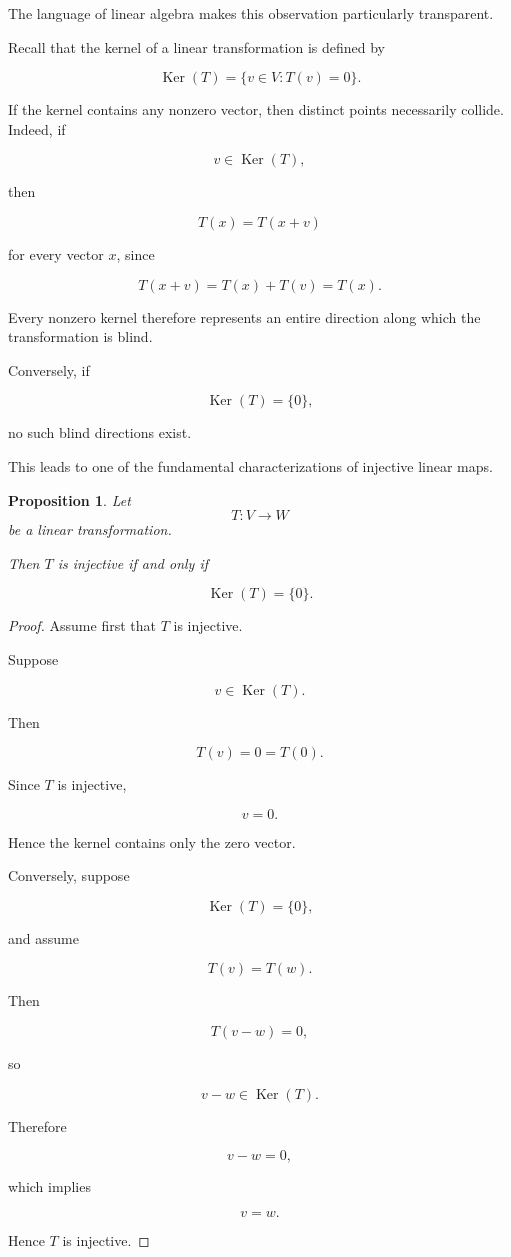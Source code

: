 \documentclass[11pt]{book}
\numberwithin{equation}{chapter}
\theoremstyle{definition}
\theoremstyle{plain}
\newtheorem{proposition}[definition]{Proposition}
\theoremstyle{remark}
\DeclareMathOperator{\Ker}{Ker}
\begin{document}
The language of linear algebra makes this observation particularly transparent.

Recall that the kernel of a linear transformation is defined by

\[
\Ker(T)
=
\{v\in V:T(v)=0\}.
\]

If the kernel contains any nonzero vector, then distinct points necessarily collide. Indeed, if

\[
v\in\Ker(T),
\]

then

\[
T(x)=T(x+v)
\]

for every vector \(x\), since

\[
T(x+v)
=
T(x)+T(v)
=
T(x).
\]

Every nonzero kernel therefore represents an entire direction along which the transformation is blind.

Conversely, if

\[
\Ker(T)=\{0\},
\]

no such blind directions exist.

This leads to one of the fundamental characterizations of injective linear maps.

\begin{proposition}
Let
\[
T:V\rightarrow W
\]
be a linear transformation.

Then \(T\) is injective if and only if

\[
\Ker(T)=\{0\}.
\]
\end{proposition}

\begin{proof}
Assume first that \(T\) is injective.

Suppose

\[
v\in\Ker(T).
\]

Then

\[
T(v)=0=T(0).
\]

Since \(T\) is injective,

\[
v=0.
\]

Hence the kernel contains only the zero vector.

Conversely, suppose

\[
\Ker(T)=\{0\},
\]

and assume

\[
T(v)=T(w).
\]

Then

\[
T(v-w)=0,
\]

so

\[
v-w\in\Ker(T).
\]

Therefore

\[
v-w=0,
\]

which implies

\[
v=w.
\]

Hence \(T\) is injective.
\end{proof}
\end{document}
